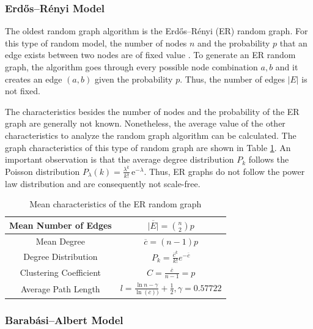 \subsubsection{Erdős–Rényi Model}

The oldest random graph algorithm is the 
Erdős–Rényi (ER) random graph. For this type of random model, the
number of nodes $n$ and the probability $p$ that an 
edge exists between two nodes are of fixed value \cite{basicnetwork}. 
To generate an ER random graph, the algorithm goes through 
every possible node combination $a, b$ and it creates an edge 
$(a, b)$ given the probability $p$. 
Thus, the number of edges $|E|$ is not fixed.

The characteristics besides the number of nodes and the
probability of the ER graph are generally not known.
Nonetheless, the average value of the other
characteristics to analyze the random graph algorithm can be calculated.
The graph characteristics of this type of random graph are shown in Table 
\ref{erdos-model}.
An important observation is that 
the average degree distribution $P_k$ follows the Poisson distribution
$P_\lambda (k) = \frac{\lambda^k}{k!}\, \mathrm{e}^{-\lambda}$. Thus,
ER graphs do not follow the power law distribution and are consequently
not scale-free. 

\begin{table}[ht!]
    \centering
    \begin{tabular}{|c | c |} 
     \hline
     Mean Number of Edges & 
     $\overline{|E|} = \binom{n}{2}p$  \\ 
     \hline
     Mean Degree & 
     $\overline{c} = (n-1)p$ \\ 
     \hline
     Degree Distribution & 
     $P_k = \frac{\overline{c}^k}{k!} e^{-\overline{c}}$ \\ 
     \hline
     Clustering Coefficient & 
     $C=\frac{\overline{c}}{n-1}=p$ \\ 
     \hline
     Average Path Length \cite{averagepath}& 
     $l = \frac{\ln{n} - \gamma}{\ln(\overline{c}))} + \frac{1}{2}, 
     \gamma=0.57722$ \\ 
     \hline
    \end{tabular}
    \caption{Mean characteristics of the ER random graph \cite{basicnetwork}}
    \label{erdos-model}
\end{table}

\subsubsection{Barabási–Albert Model}

